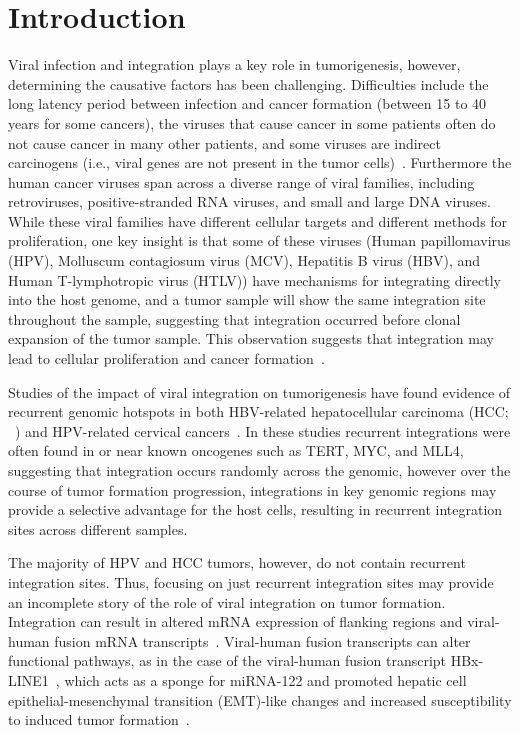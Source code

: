 \documentclass[10pt]{article}
\begin{document}
\section*{Introduction}
Viral infection and integration plays a key role in tumorigenesis, however, determining the causative factors has been challenging.  Difficulties include the long latency period between infection and cancer formation (between 15 to 40 years for some cancers), the viruses that cause cancer in some patients often do not cause cancer in many other patients, and some viruses are indirect carcinogens (i.e., viral genes are not present in the tumor cells)~\cite{Hausen2009}.  Furthermore the human cancer viruses span across a diverse range of viral families, including retroviruses, positive-stranded RNA viruses, and small and large DNA viruses.  While these viral families have different cellular targets and different methods for proliferation, one key insight is that some of these viruses (Human papillomavirus (HPV), Molluscum contagiosum virus (MCV), Hepatitis B virus (HBV), and Human T-lymphotropic virus (HTLV)) have mechanisms for integrating directly into the host genome, and a tumor sample will show the same integration site throughout the sample, suggesting that integration occurred before clonal expansion of the tumor sample.  This observation suggests that integration may lead to cellular proliferation and cancer formation~\cite{Moore2010}.

Studies of the impact of viral integration on tumorigenesis have found evidence of recurrent genomic hotspots in both HBV-related hepatocellular carcinoma (HCC; ~\cite{Ding2012, Khoury2013}) and HPV-related cervical cancers~\cite{Schmitz2012}.  In these studies recurrent integrations were often found in or near known oncogenes such as TERT, MYC, and MLL4, suggesting that integration occurs randomly across the genomic, however over the course of tumor formation progression, integrations in key genomic regions may provide a selective advantage for the host cells, resulting in recurrent integration sites across different samples.  

The majority of HPV and HCC tumors, however, do not contain recurrent integration sites.  Thus, focusing on just recurrent integration sites may provide an incomplete story of the role of viral integration on tumor formation.  Integration can result in altered mRNA expression of flanking regions and viral-human fusion mRNA transcripts~\cite{Tang2013}.  Viral-human fusion transcripts can alter functional pathways, as in the case of the viral-human fusion transcript HBx-LINE1~\cite{Lau2014}, which acts as a sponge for miRNA-122 and promoted hepatic cell epithelial-mesenchymal transition (EMT)-like changes and increased susceptibility to induced tumor formation~\cite{Liang2016}.  
\end{document}
